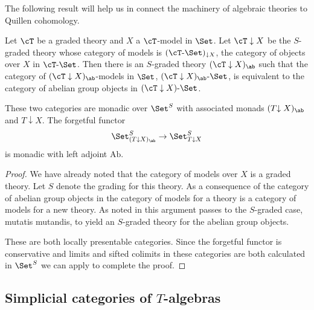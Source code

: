 \documentclass[leqno,oneside,english]{elsarticle}
\begin{document}
The following result will help us in  connect the machinery of algebraic theories to Quillen cohomology.
\begin{prop}\label{prop:abelianization-adjunction}
  Let $\cT$ be a graded theory and $X$ a $\cT$-model in $\Set$.  Let
  $\cT \downarrow X$ be the $S$-graded theory whose
  category of models is $({{\cT}\text{-}{\Set}})_{\downarrow X}$, the
  category of objects over $X$ in ${{\cT}\text{-}{\Set}}$. Then there is an
  $S$-graded theory $(\cT \downarrow X)_{\ab}$ such that the category
  of $(\cT \downarrow X)_{\ab}$-models in $\Set$, ${{(\cT
    \downarrow X)_{\ab}}\text{-}{\Set}}$, is equivalent to the category of abelian
  group objects in ${{(\cT \downarrow X)}\text{-}{\Set}}$.

  These two categories are monadic over $\Set^S$ with associated
  monads $(T{\downarrow X})_\ab$ and $T{\downarrow X}$.  The forgetful functor 
  \[
  \Set^{S}_{(T{\downarrow X})_\ab}\rightarrow \Set^{S}_{T{\downarrow X}} 
  \]
  is monadic with left adjoint $\textrm{Ab}$.
\end{prop}

\begin{proof}
  We have already noted that the category of models over $X$ is a
  graded theory. Let $S$ denote the
  grading for this theory. As a consequence of
  \cite[Thm.~3.11.3]{Bor94a} the category of abelian group objects in
  the category of models for a theory is a category of
  models for a new theory.  As noted in \cite[\S~3.3]{Bla08} this
  argument passes to the $S$-graded case, mutatis mutandis, to yield
  an $S$-graded theory for the abelian group objects.

  These are both locally presentable categories. Since the forgetful functor is conservative and limits and sifted colimits in these categories are both calculated in $\Set^S$ we can apply
   to complete the proof.
\end{proof}

\subsection{Simplicial categories of
\texorpdfstring{$T$}{T}-algebras}\label{sec:simplicial-cat}
\end{document}
